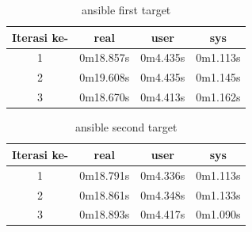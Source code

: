\documentclass[10pt,]{report}
\begin{document}
\begin{adjustwidth}{20pt}{}
	\begin{table}[H]
		\caption{ansible first target}
		\begin{center}
			\begin{tabular}[c]{|c|c|c|c|}
				\hline
				\multicolumn{1}{|c|}{\textbf{Iterasi ke-}} &
				\multicolumn{1}{c|}{\textbf{real}}         &
				\multicolumn{1}{c|}{\textbf{user}}         &
				\multicolumn{1}{c|}{\textbf{sys}}                                            \\
				\hline
				1                                          & 0m18.857s & 0m4.435s & 0m1.113s \\
				\hline
				2                                          & 0m19.608s & 0m4.435s & 0m1.145s \\
				\hline
				3                                          & 0m18.670s & 0m4.413s & 0m1.162s \\
				\hline
			\end{tabular}
		\end{center}
	\end{table}
	\vspace{-5mm}
	\begin{table}[H]
		\caption{ansible second target}
		\begin{center}
			\begin{tabular}[c]{|c|c|c|c|}
				\hline
				\multicolumn{1}{|c|}{\textbf{Iterasi ke-}} &
				\multicolumn{1}{c|}{\textbf{real}}         &
				\multicolumn{1}{c|}{\textbf{user}}         &
				\multicolumn{1}{c|}{\textbf{sys}}                                            \\
				\hline
				1                                          & 0m18.791s & 0m4.336s & 0m1.113s \\
				\hline
				2                                          & 0m18.861s & 0m4.348s & 0m1.133s \\
				\hline
				3                                          & 0m18.893s & 0m4.417s & 0m1.090s \\
				\hline
			\end{tabular}
		\end{center}
	\end{table}

\end{adjustwidth}
\end{document}
